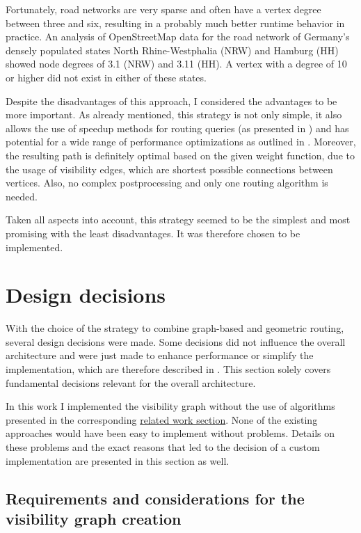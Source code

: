 		Fortunately, road networks are very sparse and often have a vertex degree between three and six\cite{zhao-analysis-osm-bejing}\cite{boeing-osmnx}, resulting in a probably much better runtime behavior in practice.
		An analysis of OpenStreetMap data for the road network of Germany's densely populated states North Rhine-Westphalia (NRW) and Hamburg (HH) showed node degrees of 3.1 (NRW) and 3.11 (HH).
		A vertex with a degree of 10 or higher did not exist in either of these states.
		
		Despite the disadvantages of this approach, I considered the advantages to be more important.
		As already mentioned, this strategy is not only simple, it also allows the use of speedup methods for routing queries (as presented in ) and has potential for a wide range of performance optimizations as outlined in .
		Moreover, the resulting path is definitely optimal based on the given weight function, due to the usage of visibility edges, which are shortest possible connections between vertices. 
		Also, no complex postprocessing and only one routing algorithm is needed.
		
		Taken all aspects into account, this strategy seemed to be the simplest and most promising with the least disadvantages.
		It was therefore chosen to be implemented.

\section{Design decisions}
\label{sec:design-decisions}

	With the choice of the strategy to combine graph-based and geometric routing, several design decisions were made.
	Some decisions did not influence the overall architecture and were just made to enhance performance or simplify the implementation, which are therefore described in .
	This section solely covers fundamental decisions relevant for the overall architecture.
	
	In this work I implemented the visibility graph without the use of algorithms presented in the corresponding \hyperref[subsec:related-work:visibility-graph]{related work section}.
	None of the existing approaches would have been easy to implement without problems.
	Details on these problems and the exact reasons that led to the decision of a custom implementation are presented in this section as well.
	
	\subsection{Requirements and considerations for the visibility graph creation}
	
